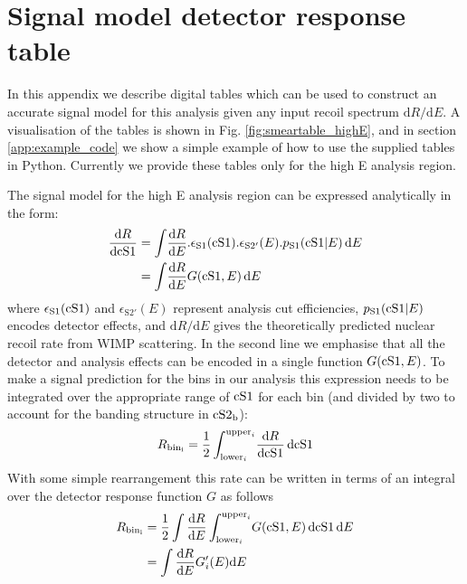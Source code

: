 \section{Signal model detector response table}

In this appendix we describe digital tables which can be used to construct an accurate signal model for this analysis given any input recoil spectrum $\mathrm{d}R/\mathrm{d}E$. A visualisation of the tables is shown in Fig. \ref{fig:smeartable_highE}, and in section \ref{app:example_code} we show a simple example of how to use the supplied tables in Python. Currently we provide these tables only for the high E analysis region.

The signal model for the high E analysis region can be expressed analytically in the form:
%
\begin{align}
\label{eq:high2D}
  \frac{\mathrm{d} R}{\mathrm{d}\mathrm{cS1}} &= \int \! \frac{\mathrm{d}R}{\mathrm{d}E}.\epsilon_\mathrm{S1}(\mathrm{cS1}) .\epsilon_\mathrm{S2'}(E).p_\mathrm{S1}(\mathrm{\mathrm{cS1}}|E) \, \mathrm{d}E \\
  &= \int \! \frac{\mathrm{d}R}{\mathrm{d}E} G(\mathrm{cS1},E) \, \mathrm{d}E
\end{align}
%
where $\epsilon_\mathrm{S1}(\mathrm{cS1})$ and $\epsilon_\mathrm{S2'}(E)$ represent analysis cut efficiencies, $p_\mathrm{S1}(\mathrm{\mathrm{cS1}}|E)$ encodes detector effects, and $\mathrm{d}R/\mathrm{d}E$ gives the theoretically predicted nuclear recoil rate from WIMP scattering. In the second line we emphasise that all the detector and analysis effects can be encoded in a single function $G(\mathrm{cS1},E)$. To make a signal prediction for the bins in our analysis this expression needs to be integrated over the appropriate range of $\mathrm{cS1}$ for each bin (and divided by two to account for the banding structure in $\mathrm{cS2}_\mathrm{b}$):
%
\begin{equation}
  R_\mathrm{bin_i} = \frac{1}{2}\int_{\mathrm{lower}_i}^{\mathrm{upper}_i} \! \frac{\mathrm{d} R}{\mathrm{d}\mathrm{cS1}} \, \mathrm{d}\mathrm{cS1}
\end{equation}
%
With some simple rearrangement this rate can be written in terms of an integral over the detector response function $G$ as follows
%
\begin{align}
  R_\mathrm{bin_i} &= \frac{1}{2}\int\frac{\mathrm{d} R}{\mathrm{d}E}\int_{\mathrm{lower}_i}^{\mathrm{upper}_i} \! G(\mathrm{cS1},E) \, \mathrm{d}\mathrm{cS1} \, \mathrm{d}E \\
 &= \int\frac{\mathrm{d} R}{\mathrm{d}E} G'_i(E) \mathrm{d}E
\end{align}
%
